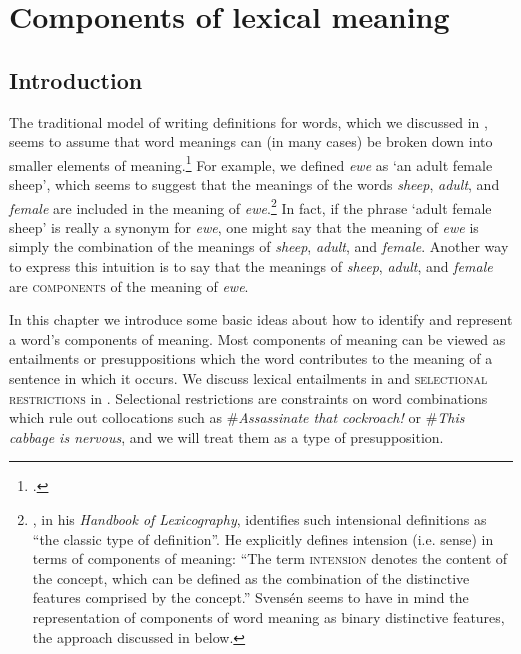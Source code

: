 \chapter{Components of lexical meaning}\label{sec:7}

\section{Introduction}\label{sec:7.1}

The traditional model of writing definitions for words, which we discussed in , seems to assume that word meanings can (in many cases) be broken down into smaller elements of meaning.\footnote{\citet[126]{Engelberg2011}.} For example, we defined \textit{ewe} as ‘an adult female sheep’, which seems to suggest that the meanings of the words \textit{sheep}, \textit{adult}, and \textit{female} are included in the meaning of \textit{ewe}.\footnote{\citet[218]{Svensén2009}, in his \textit{Handbook of Lexicography}, identifies such intensional definitions as “the classic type of definition”. He explicitly defines intension (i.e. sense) in terms of components of meaning: “The term \textsc{intension} denotes the content of the concept, which can be defined as the combination of the distinctive features comprised by the concept.” Svensén seems to have in mind the representation of components of word meaning as binary distinctive features, the approach discussed in  below.} In fact, if the phrase ‘adult female sheep’ is really a synonym for \textit{ewe}, one might say that the meaning of \textit{ewe} is simply the combination of the meanings of \textit{sheep}, \textit{adult}, and \textit{female}. Another way to express this intuition is to say that the meanings of \textit{sheep}, \textit{adult}, and \textit{female} are \textsc{components} of the meaning of \textit{ewe}.



In this chapter we introduce some basic ideas about how to identify and represent a word’s components of meaning. Most components of meaning can be viewed as entailments or presuppositions which the word contributes to the meaning of a sentence in which it occurs. We discuss lexical entailments in  and \textsc{selectional restrictions} in . Selectional restrictions are constraints on word combinations which rule out collocations such as \#\textit{Assassinate that cockroach!} or \#\textit{This cabbage is nervous}, and we will treat them as a type of presupposition.



